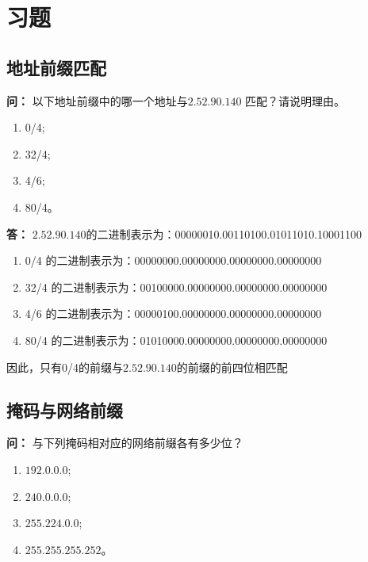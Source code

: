 \documentclass[12pt,hyperref,a4paper,UTF8]{ctexart}
\begin{document}
\cover
\thispagestyle{empty}%


\newpage
\tableofcontents

\newpage
\section{习题}

\subsection{地址前缀匹配}
\textbf{问：}
以下地址前缀中的哪一个地址与$2.52.90.140$ 匹配？请说明理由。
\begin{enumerate}[label=\Roman*),leftmargin=2.2\parindent]
    \item 0/4; 
    \item 32/4; 
    \item 4/6; 
    \item 80/4。
\end{enumerate}

\textbf{答：}
$2.52.90.140$的二进制表示为：00000010.00110100.01011010.10001100
\begin{enumerate}
    \item 0/4 的二进制表示为：00000000.00000000.00000000.00000000
    \item 32/4 的二进制表示为：00100000.00000000.00000000.00000000
    \item 4/6 的二进制表示为：00000100.00000000.00000000.00000000
    \item 80/4 的二进制表示为：01010000.00000000.00000000.00000000
\end{enumerate}
因此，只有0/4的前缀与$2.52.90.140$的前缀的前四位相匹配


\subsection{掩码与网络前缀}
\textbf{问：}
与下列掩码相对应的网络前缀各有多少位？
\begin{enumerate}[label=\Roman*),leftmargin=2.2\parindent]
    \item $192.0.0.0$;
    \item $240.0.0.0$;
    \item $255.224.0.0$;
    \item $255.255.255.252$。 
\end{enumerate}
\end{document}
